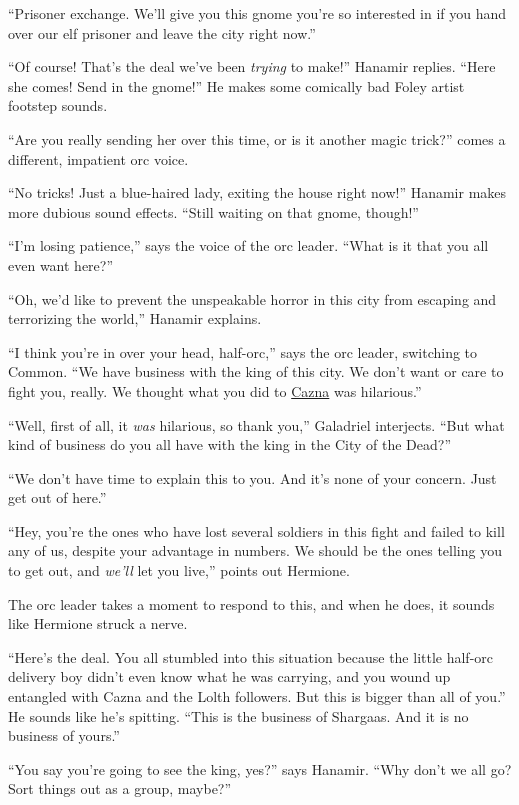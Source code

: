 \documentclass[smalldemyvopaper,11pt,twoside,onecolumn,openright,extrafontsizes]{memoir}
\begin{document}
``Prisoner exchange. We'll give you this gnome you're so interested in
if you hand over our elf prisoner and leave the city right now.''

``Of course! That's the deal we've been \emph{trying} to make!'' Hanamir
replies. ``Here she comes! Send in the gnome!'' He makes some comically
bad Foley artist footstep sounds.

``Are you really sending her over this time, or is it another magic
trick?'' comes a different, impatient orc voice.

``No tricks! Just a blue-haired lady, exiting the house right now!''
Hanamir makes more dubious sound effects. ``Still waiting on that gnome,
though!''

``I'm losing patience,'' says the voice of the orc leader. ``What is it
that you all even want here?''

``Oh, we'd like to prevent the unspeakable horror in this city from
escaping and terrorizing the world,'' Hanamir explains.

``I think you're in over your head, half-orc,'' says the orc leader,
switching to Common. ``We have business with the king of this city. We
don't want or care to fight you, really. We thought what you did to
\href{/characters/cazna/}{Cazna} was hilarious.''

``Well, first of all, it \emph{was} hilarious, so thank you,'' Galadriel
interjects. ``But what kind of business do you all have with the king in
the City of the Dead?''

``We don't have time to explain this to you. And it's none of your
concern. Just get out of here.''

``Hey, you're the ones who have lost several soldiers in this fight and
failed to kill any of us, despite your advantage in numbers. We should
be the ones telling you to get out, and \emph{we'll} let you live,''
points out Hermione.

The orc leader takes a moment to respond to this, and when he does, it
sounds like Hermione struck a nerve.

``Here's the deal. You all stumbled into this situation because the
little half-orc delivery boy didn't even know what he was carrying, and
you wound up entangled with Cazna and the Lolth followers. But this is
bigger than all of you.'' He sounds like he's spitting. ``This is the
business of Shargaas. And it is no business of yours.''

``You say you're going to see the king, yes?'' says Hanamir. ``Why don't
we all go? Sort things out as a group, maybe?''
\end{document}
